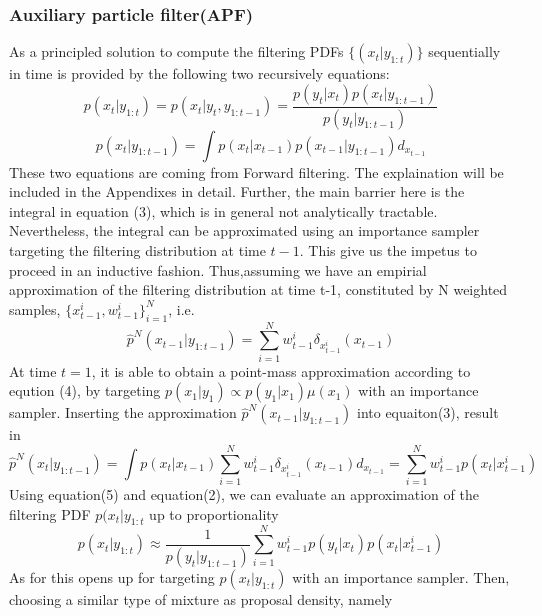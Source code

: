 \documentclass[11pt,oneside,a4paper]{article}
\begin{document}
\subsubsection{Auxiliary particle filter(APF)}
As a principled solution to compute the filtering PDFs $ \lbrace (x_{t}|y_{1:t}) \rbrace $ sequentially in time is provided by the following
two recursively equations:
\begin{equation}
p(x_{t} | y_{1:t}) = p(x_t | y_t, y_{1:t-1}) = \frac{p(y_t|x_t)p(x_t|y_{1:t-1})}{p(y_t|y_{1:t-1})}
\end{equation}
\begin{equation}
p(x_{t} | y_{1:t-1}) = \int p(x_t|x_{t-1})p(x_{t-1}|y_{1:t-1}) d_{x_{t-1}}
\end{equation}
These two equations are coming from Forward filtering. The explaination will be included in the Appendixes in detail. Further, the main barrier here is the integral in equation (3), which is in general
not analytically tractable. Nevertheless, the integral can be approximated using an importance sampler targeting the filtering distribution at time $ t-1 $. This give us the impetus to proceed in an inductive
fashion. Thus,assuming we have an empirial approximation of the filtering distribution at time t-1, constituted by N weighted samples, $\{ x_{t-1}^i, w_{t-1}^i \}_{i=1}^{N} $, i.e.
\begin{equation}
\hat{p}^N(x_{t-1}|y_{1:t-1}) = \sum_{i=1}^N w_{t-1}^i\delta_{x_{t-1}^i}(x_{t-1})
\end{equation}
At time $t = 1 $, it is able to obtain a point-mass approximation according to eqution (4), by targeting $p(x_{1}|y_{1}) \propto p(y_{1}|x_{1})\mu{(x_{1})} $ with an importance sampler. Inserting the approximation
$\hat{p}^N(x_{t-1}|y_{1:t-1}) $ into equaiton(3), result in
\begin{equation}
\hat{p}^N(x_{t}|y_{1:t-1}) = \int p(x_{t}|x_{t-1}) \sum_{i=1}^{N} w_{t-1}^{i}\delta_{x_{t-1}^{i}}(x_{t-1})d_{x_{t-1}} = \sum_{i=1}^{N}w_{t-1}^{i}p(x_{t}|x_{t-1}^{i})
\end{equation}
Using equation(5) and equation(2), we can evaluate an approximation of the filtering PDF $p(x_t|y_{1:t} $ up to proportionality
\begin{equation}
p(x_{t}|y_{1:t}) \approx \frac{1}{p(y_t|y_{1:t-1})} \sum_{i=1}^N w_{t-1}^i p(y_t|x_t)p(x_t|x_{t-1}^i)
\end{equation}
As for this opens up for targeting $p(x_{t}|y_{1:t}) $ with an importance sampler. Then, choosing a similar type of mixture
as proposal density, namely
\end{document}
